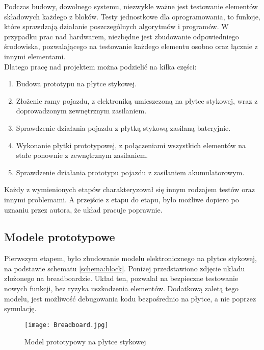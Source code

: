 \label{sec:testing}
    Podczas budowy, dowolnego systemu, niezwykle ważne jest testowanie elementów składowych każdego z bloków.
    Testy jednostkowe dla oprogramowania, to funkcje, które sprawdzają działanie poszczególnych algorytmów i programów.
    W przypadku prac nad hardwarem, niezbędne jest zbudowanie odpowiedniego środowiska, pozwalającego na testowanie każdego elementu osobno oraz łącznie z innymi elementami.\\
% 
    Dlatego pracę nad projektem można podzielić na kilka części:
    \begin{enumerate}
        \item Budowa prototypu na płytce stykowej.
        \item Złożenie ramy pojazdu, z elektroniką umieszczoną na płytce stykowej, wraz z doprowadzonym zewnętrznym zasilaniem.
        \item Sprawdzenie działania pojazdu z płytką stykową zasilaną bateryjnie.
        \item Wykonanie płytki prototypowej, z połączeniami wszystkich elementów na stałe ponownie z zewnętrznym zasilaniem.
        \item Sprawdzenie działania prototypu pojazdu z zasilaniem akumulatorowym.
    \end{enumerate}
    Każdy z wymienionych etapów charakteryzował się innym rodzajem testów oraz innymi problemami.
    A przejście z etapu do etapu, było możliwe dopiero po uznaniu przez autora, że układ pracuje poprawnie.

    \subsection{Modele prototypowe}
        Pierwszym etapem, było zbudowanie modelu elektronicznego na płytce stykowej, na podstawie schematu \ref{schema:block}.
        Poniżej przedstawiono zdjęcie układu złożonego na breadboardzie.
        Układ ten, pozwalał na bezpieczne testowanie nowych funkcji, bez ryzyka uszkodzenia elementów.
        Dodatkową zaletą tego modelu, jest możliwość debugowania kodu bezpośrednio na płytce, a nie poprzez symulację.
        \begin{figure}[!ht]
            \centering
            \texttt{[image: Breadboard.jpg]}
            \caption{Model prototypowy na płytce stykowej}
            \label{fig:breadboard}
        \end{figure}


